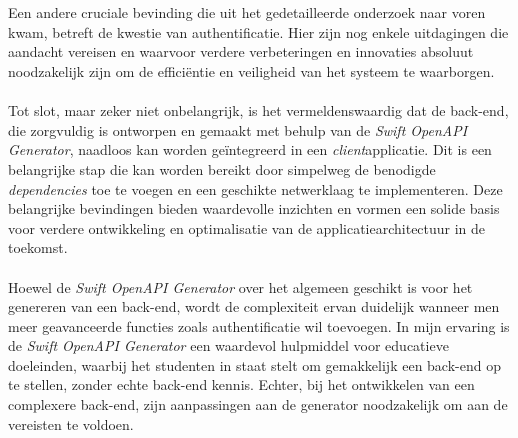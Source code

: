 \\ \\
Een andere cruciale bevinding die uit het gedetailleerde onderzoek naar voren kwam, betreft de kwestie van authentificatie. Hier zijn nog enkele uitdagingen die aandacht vereisen en waarvoor verdere verbeteringen en innovaties absoluut noodzakelijk zijn om de efficiëntie en veiligheid van het systeem te waarborgen.
\\ \\
Tot slot, maar zeker niet onbelangrijk, is het vermeldenswaardig dat de back-end, die zorgvuldig is ontworpen en gemaakt met behulp van de \textit{Swift OpenAPI Generator}, naadloos kan worden geïntegreerd in een \textit{client}applicatie. Dit is een belangrijke stap die kan worden bereikt door simpelweg de benodigde \textit{dependencies} toe te voegen en een geschikte netwerklaag te implementeren. Deze belangrijke bevindingen bieden waardevolle inzichten en vormen een solide basis voor verdere ontwikkeling en optimalisatie van de applicatiearchitectuur in de toekomst.
\\ \\
Hoewel de \textit{Swift OpenAPI Generator} over het algemeen geschikt is voor het genereren van een back-end, wordt de complexiteit ervan duidelijk wanneer men meer geavanceerde functies zoals authentificatie wil toevoegen. In mijn ervaring is de \textit{Swift OpenAPI Generator} een waardevol hulpmiddel voor educatieve doeleinden, waarbij het studenten in staat stelt om gemakkelijk een back-end op te stellen, zonder echte back-end kennis. Echter, bij het ontwikkelen van een complexere back-end, zijn aanpassingen aan de generator noodzakelijk om aan de vereisten te voldoen.